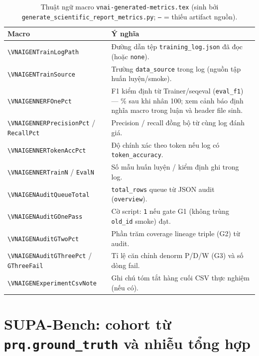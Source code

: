 \begin{table}[h]
\centering
\caption{Thuật ngữ macro \texttt{vnai-generated-metrics.tex} (sinh bởi \texttt{generate\_scientific\_report\_metrics.py}; \texttt{---} = thiếu artifact nguồn).}
\label{tab:vnaigen-macro-glossary}
\small
\begin{tabular}{@{}p{4.8cm}p{9.8cm}@{}}
\toprule
\textbf{Macro} & \textbf{Ý nghĩa} \\
\midrule
\texttt{\textbackslash VNAIGENTrainLogPath} & Đường dẫn tệp \texttt{training\_log.json} đã đọc (hoặc \texttt{none}). \\
\texttt{\textbackslash VNAIGENTrainSource} & Trường \texttt{data\_source} trong log (nguồn tập huấn luyện/smoke). \\
\texttt{\textbackslash VNAIGENNERFOnePct} & F1 kiểm định từ Trainer/seqeval (\texttt{eval\_f1}) --- \% sau khi nhân 100; xem cảnh báo định nghĩa macro trong luận và header file sinh. \\
\texttt{\textbackslash VNAIGENNERPrecisionPct} / \texttt{RecallPct} & Precision / recall đồng bộ từ cùng log đánh giá. \\
\texttt{\textbackslash VNAIGENNERTokenAccPct} & Độ chính xác theo token nếu log có \texttt{token\_accuracy}. \\
\texttt{\textbackslash VNAIGENNERTrainN} / \texttt{EvalN} & Số mẫu huấn luyện / kiểm định ghi trong log. \\
\texttt{\textbackslash VNAIGENAuditQueueTotal} & \texttt{total\_rows} queue từ JSON audit (\texttt{overview}). \\
\texttt{\textbackslash VNAIGENAuditGOnePass} & Cờ script: \texttt{1} nếu gate G1 (không trùng \texttt{old\_id} smoke) đạt. \\
\texttt{\textbackslash VNAIGENAuditGTwoPct} & Phần trăm coverage lineage triple (G2) từ audit. \\
\texttt{\textbackslash VNAIGENAuditGThreePct} / \texttt{GThreeFail} & Tỉ lệ căn chỉnh denorm P/D/W (G3) và số dòng fail. \\
\texttt{\textbackslash VNAIGENExperimentCsvNote} & Ghi chú tóm tắt hàng cuối CSV thực nghiệm (nếu có). \\
\bottomrule
\end{tabular}
\end{table}

\section{SUPA-Bench: cohort từ \texttt{prq.ground\_truth} và nhiễu tổng hợp}
\label{sec:supa-bench-exp}


